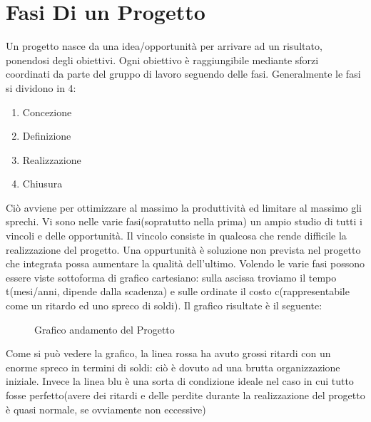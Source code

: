 \documentclass{report}
\begin{document}
\chapter{Fasi Di un Progetto}
Un progetto nasce da una idea/opportunità per arrivare ad un risultato, ponendosi degli obiettivi.
Ogni obiettivo è raggiungibile mediante sforzi coordinati da parte del gruppo di lavoro seguendo delle fasi.
Generalmente le fasi si dividono in 4:

\begin{enumerate}
\item Concezione
\item Definizione
\item Realizzazione
\item Chiusura	
\end{enumerate}

Ciò avviene per ottimizzare al massimo la produttività ed limitare al massimo gli sprechi.
Vi sono nelle varie fasi(sopratutto nella prima) un ampio studio di tutti i vincoli e delle opportunità.
Il vincolo consiste in qualcosa che rende difficile la realizzazione del progetto.
Una oppurtunità è soluzione non prevista nel progetto che integrata possa aumentare la qualità dell'ultimo.
Volendo le varie fasi possono essere viste sottoforma di grafico cartesiano:
sulla ascissa troviamo il tempo t(mesi/anni, dipende dalla scadenza) e sulle ordinate il costo c(rappresentabile come un ritardo ed uno spreco di soldi).
Il grafico risultate è il seguente:
\begin{figure}[h!]
\caption{Grafico andamento del Progetto}
\label{grap1}
\end{figure}

Come si può vedere la grafico, la linea rossa ha avuto grossi ritardi con un enorme spreco in termini di soldi: ciò è dovuto ad una brutta organizzazione iniziale.
Invece la linea blu è una sorta di condizione ideale nel caso in cui tutto fosse perfetto(avere dei ritardi e delle perdite durante la realizzazione del progetto è quasi normale, se ovviamente non eccessive)
\end{document}
